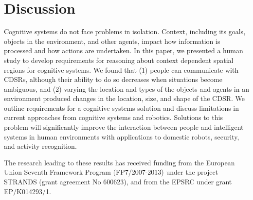 \documentclass[11pt,letterpaper]{article}
\begin{document}



\section{Discussion}
Cognitive systems do not face problems in isolation.  Context, including its goals, objects in the environment, and other agents, impact how information is processed and how actions are undertaken.  In this paper, we presented a human study to develop requirements for reasoning about context dependent spatial regions for cognitive systems.  We found that (1) people can communicate with CDSRs, although their ability to do so decreases when situations become ambiguous, and (2) varying the location and types of the objects and agents in an environment produced changes in the location, size, and shape of the CDSR.  We outline requirements for a cognitive systems solution and discuss limitations in current approaches from cognitive systems and robotics.  Solutions to this problem will significantly improve the interaction between people and intelligent systems in human environments with applications to domestic robots, security, and activity recognition.

\begin{acknowledgements} 
\noindent
The research leading to these results has received funding from the European Union Seventh Framework Program (FP7/2007-2013) under the project STRANDS (grant agreement No 600623), and from the EPSRC under grant EP/K014293/1.
\end{acknowledgements} 




\vspace{-0.25in}

{\parindent -10pt\leftskip 10pt\noindent
\footnotesize



}

\end{document}
